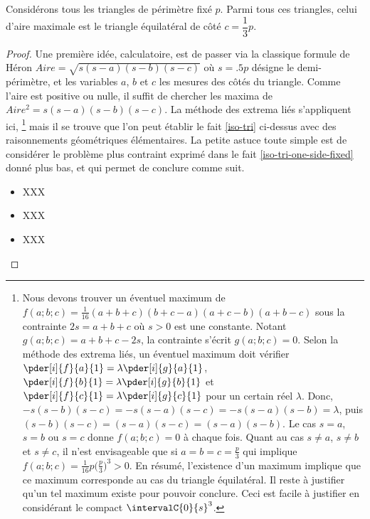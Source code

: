 \begin{fact}\label{iso-tri}
	Considérons tous les triangles de périmètre fixé $p$. Parmi tous ces triangles, celui d'aire maximale est le triangle équilatéral de côté $c = \dfrac13 p$.
\end{fact}


\begin{proof}
	Une première idée, calculatoire, est de passer via la classique formule de Héron $Aire = \sqrt{s(s - a)(s - b)(s - c)}$ où $s = \num{.5} p$ désigne le demi-périmètre, et les variables $a$, $b$ et $c$ les mesures des côtés du triangle. 
	Comme l'aire est positive ou nulle, il suffit de chercher les maxima de $Aire^2 = s(s - a)(s - b)(s - c)$. La méthode des extrema liés s'appliquent ici,%
	\footnote{
		Nous devons trouver un éventuel maximum de $f(a;b;c) = \frac{1}{16} (a + b + c)(b + c - a)(a + c - b)(a + b - c)$ sous la contrainte $2s = a + b + c$ où $s > 0$ est une constante.
		Notant $g(a;b;c) = a + b + c - 2 s$, la contrainte s'écrit $g(a;b;c) = 0$.
		Selon la méthode des extrema liés, un éventuel maximum doit vérifier 
		$\pder[i]{f}{a}{1} = \lambda \pder[i]{g}{a}{1}$,
		$\pder[i]{f}{b}{1} = \lambda \pder[i]{g}{b}{1}$ et
		$\pder[i]{f}{c}{1} = \lambda \pder[i]{g}{c}{1}$
		pour un certain réel $\lambda$.
		Donc,
		$- s(s - b)(s - c) = - s(s - a)(s - c) = - s(s - a)(s - b) = \lambda$,
		puis
		$(s - b)(s - c) = (s - a)(s - c) = (s - a)(s - b)$.
		Le cas $s = a$, $s = b$ ou $s = c$ donne $f(a;b;c) = 0$ à chaque fois.
		Quant au cas $s \neq a$, $s \neq b$ et $s \neq c$, il n'est envisageable que si $a = b = c = \frac{p}{3}$ qui implique $f(a;b;c) = \frac{1}{16} p \big( \frac{p}{3} \big)^3 > 0$.
		En résumé, l'existence d'un maximum implique que ce maximum corresponde au cas du triangle équilatéral.
		Il reste à justifier qu'un tel maximum existe pour pouvoir conclure.
		Ceci est facile à justifier en considérant le compact $\intervalC{0}{s}^3$. 
	}
	mais il se trouve que l'on peut établir le fait \ref{iso-tri} ci-dessus avec des raisonnements géométriques élémentaires.
	La petite astuce toute simple est de considérer le problème plus contraint exprimé dans le fait \ref{iso-tri-one-side-fixed} donné plus bas, et qui permet de conclure comme suit.
	\begin{itemize}
		\item XXX

		\item XXX

		\item XXX
	\end{itemize}
\end{proof}


